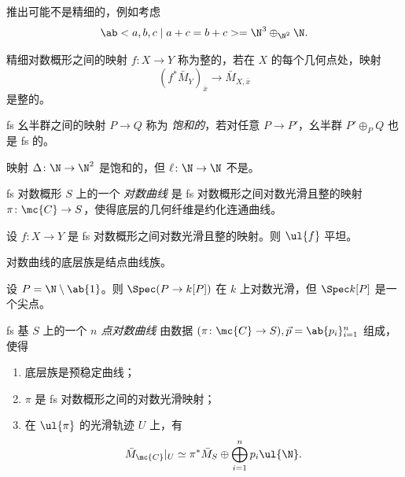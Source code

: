 \begin{exm}
    推出可能不是精细的，例如考虑
    \[ \ab< a ,b,c \mid a+c=b+c> = \N^3 \oplus_{\N^2} \N. \]
\end{exm}

\begin{defn}
    精细对数概形之间的映射 \(f \colon X \to Y\) 称为整的，若在 \(X\) 的每个几何点处，映射
    \[ (f^*\bar{M}_Y)_{\bar{x}} \to \bar{M}_{X,\bar{x}} \]
    是整的。
\end{defn}

\begin{defn}
    fs 幺半群之间的映射 \(P \to Q\) 称为 \textit{饱和的}，若对任意 \(P \to P'\)，幺半群 \(P' \oplus_P Q\) 也是 fs 的。
\end{defn}

\begin{exm}
    映射 \(\Delta \colon \N \to \N^2\) 是饱和的，但 \(\ell \colon \N \to \N\) 不是。
\end{exm}

\begin{defn}
    fs 对数概形 \(S\) 上的一个 \textit{对数曲线} 是 fs 对数概形之间对数光滑且整的映射 \(\pi \colon \mc{C} \to S\)，使得底层的几何纤维是约化连通曲线。
\end{defn}

\begin{prop}
    设 \(f \colon X \to Y\) 是 fs 对数概形之间对数光滑且整的映射。则 \(\ul{f}\) 平坦。
\end{prop}

\begin{thm}
    对数曲线的底层族是结点曲线族。
\end{thm}

\begin{exm}
    设 \(P = \N \setminus \ab\{1\}\)。则 \(\Spec (P \to k[P])\) 在 \(k\) 上对数光滑，但 \(\Spec k[P]\) 是一个尖点。
\end{exm}

\begin{defn}
    fs 基 \(S\) 上的一个 \textit{\(n\) 点对数曲线} 由数据 \((\pi \colon \mc{C} \to S), \vec{p} = \ab\{p_i\}_{i=1}^n\) 组成，使得
    \begin{enumerate}
        \item 底层族是预稳定曲线；
        \item \(\pi\) 是 fs 对数概形之间的对数光滑映射；
        \item 在 \(\ul{\pi}\) 的光滑轨迹 \(U\) 上，有
            \[ \bar{M}_{\mc{C}}|_U \simeq \pi^* \bar{M}_S \oplus \bigoplus_{i=1}^n p_i \ul{\N}. \]
    \end{enumerate}
\end{defn}


